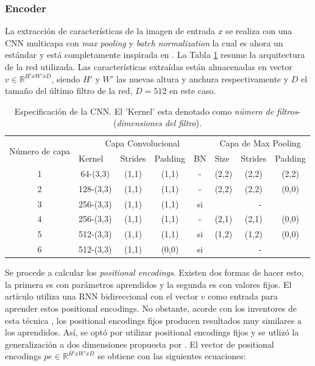 \subsubsection{Encoder}

La extracción de características de la imagen de entrada $x$ se realiza con una CNN multicapa con \textit{max pooling} y \textit{batch normalization} la cual es ahora un estándar y está completamente inspirada en \cite{harvard}. La Tabla \ref{tbl:cnn-model} resume la arquitectura de la red utilizada. Las características extraídas están almacenadas en vector $v \in \mathbb{R} ^ {H' x W' x D}$, siendo $H'$ y $W'$ las nuevas altura y anchura respectivamente y $D$ el tamaño del último filtro de la red, $D = 512$ en este caso.

\begin{table}[]
\centering
\begin{tabular}{@{}|c|c|c|c|c|c|c|c|@{}}
\toprule
\multirow{2}{*}{Número de capa} & \multicolumn{4}{c|}{Capa Convolucional} & \multicolumn{3}{c|}{Capa de Max Pooling} \\ \cmidrule(l){2-8} 
 & \multicolumn{1}{l|}{Kernel} & \multicolumn{1}{l|}{Strides} & \multicolumn{1}{l|}{Padding} & \multicolumn{1}{l|}{BN} & \multicolumn{1}{l|}{Size} & \multicolumn{1}{l|}{Strides} & \multicolumn{1}{l|}{Padding} \\ \midrule
1 & 64-(3,3) & (1,1) & (1,1) & - & (2,2) & (2,2) & (2,2) \\ \midrule
2 & 128-(3,3) & (1,1) & (1,1) & - & (2,2) & (2,2) & (0,0) \\ \midrule
3 & 256-(3,3) & (1,1) & (1,1) & si & \multicolumn{3}{c|}{-} \\ \midrule
4 & 256-(3,3) & (1,1) & (1,1) & - & (2,1) & (2,1) & (0,0) \\ \midrule
5 & 512-(3,3) & (1,1) & (1,1) & si & (1,2) & (1,2) & (0,0) \\ \midrule
6 & 512-(3,3) & (1,1) & (0,0) & si & \multicolumn{3}{c|}{-} \\ \bottomrule
\end{tabular}
\caption{Especificación de la CNN. El 'Kernel' esta denotado como \textit{número de filtros}-(\textit{dimensiones del filtro}).}
\label{tbl:cnn-model}
\end{table}

Se procede a calcular los \textit{positional encodings}. Existen dos formas de hacer esto, la primera es con parámetros aprendidos y la segunda es con valores fijos. El artículo \cite{harvard} utiliza una RNN bidireccional con el vector $v$ como entrada para aprender estos positional encodings. No obstante, acorde con los inventores de esta técnica \cite{attentionisallyouneed}, los positional encodings fijos producen resultados muy similares a los aprendidos. Así, se optó por utilizar positional encodings fijos y se utlizó la generalización a dos dimensiones propuesta por \cite{positionalencodings}. El vector de positional encodings $pe \in \mathbb{R} ^ {H'xW'xD}$ se obtiene con las siguientes ecuaciones:


